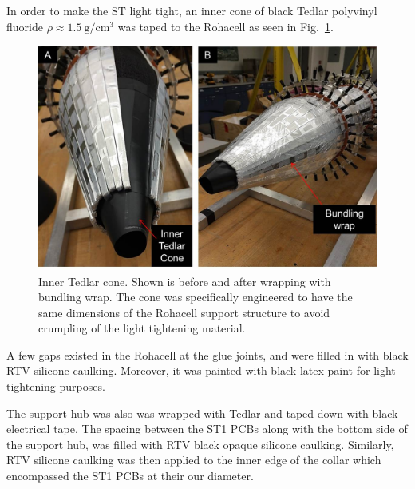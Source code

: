 In order to make the ST light tight, an inner cone of black Tedlar polyvinyl fluoride $\rho \approx 1.5\ \mathrm{g/cm^{3}}$ \cite{tedlar_pvf} was taped to the Rohacell as seen in Fig.~\ref{fig:light_tightening_cone}. 
\begin{figure}[!htb]
	\centering
	\includegraphics[width=1.0\columnwidth]{fabrication/figs/st_lt_ic_bw}
	\caption{Inner Tedlar cone.  Shown is before and after wrapping with bundling wrap.  The cone was specifically engineered to have the same dimensions of the Rohacell support structure to avoid crumpling of the light tightening material.}
	\label{fig:light_tightening_cone}
\end{figure}
A few gaps existed in the Rohacell at the glue joints, and were filled in with black RTV silicone caulking. Moreover, it was painted with black latex paint for light tightening purposes.

The support hub was also was wrapped with Tedlar and taped down with black electrical tape. The spacing between the ST1 PCBs along with the bottom side of the support hub, was filled with RTV black opaque silicone caulking.  Similarly, RTV silicone caulking was then applied to the inner edge of the collar which encompassed the ST1 PCBs at their our diameter.

